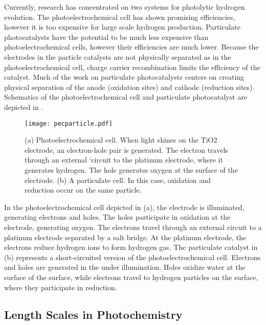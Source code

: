 Currently, research has concentrated on two systems for photolytic hydrogen 
evolution. The photoelectrochemical cell has shown promising efficiencies,
\cite{Fujishima:1972hc,User:2001tg} however it is too expensive for large 
scale hydrogen production. Particulate photocatalysts have the potential to 
be much less expensive than photoelectrochemical cells, however their 
efficiencies are much lower. \cite{Kaneko:2002vh} Because the electrodes in 
the particle catalysts are not physically separated as in the 
photoelectrochemical cell, charge carrier recombination limits the 
efficiency of the catalyst. Much of the work on particulate photocatalysts 
centers on creating physical separation of the anode (oxidation sites) and 
cathode (reduction sites).\cite{Kitano:2008io,Kudo:2008fk} Schematics of 
the photoelectrochemical cell and particulate photocatalyst are depicted in 
.
\begin{figure}
	\centering
	\texttt{[image: pecparticle.pdf]}
	\caption[Photoelectrochemical and particulate cells]{%
		(a) Photoelectrochemical cell. When light shines on the TiO2 
		electrode, an electron-hole pair is generated. The electron 
		travels through an external `circuit to the platinum electrode, 
		where it generates hydrogen. The hole generates oxygen at the 
		surface of the  electrode. (b) A particulate cell. 
		In this case, oxidation and reduction occur on the same particle.}
	\label{fig:pecparticle}
\end{figure}
In the photoelectrochemical cell depicted in (a), the  electrode is illuminated, generating electrons and holes. The holes participate in oxidation at the  electrode, generating oxygen. The electrons travel through an external circuit to a platinum electrode separated by a salt bridge. At the platinum electrode, the electrons reduce hydrogen ions to form hydrogen gas. The particulate catalyst in (b) represents a short-circuited version of the photoelectrochemical cell. Electrons and holes are generated in the  under illumination. Holes oxidize water at the surface of the  surface, while electrons travel to hydrogen particles on the surface, where they participate in reduction.


\subsection{Length Scales in Photochemistry}
\label{subsec:background.lengthscales}



